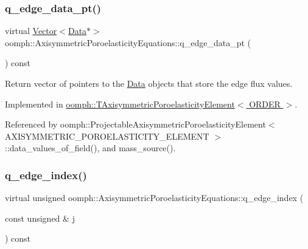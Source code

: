 \subsubsection{\texorpdfstring{q\+\_\+edge\+\_\+data\+\_\+pt()}{q\_edge\_data\_pt()}}
{\footnotesize\ttfamily virtual \hyperlink{classoomph_1_1Vector}{Vector}$<$\hyperlink{classoomph_1_1Data}{Data}$\ast$$>$ oomph\+::\+Axisymmetric\+Poroelasticity\+Equations\+::q\+\_\+edge\+\_\+data\+\_\+pt (\begin{DoxyParamCaption}{ }\end{DoxyParamCaption}) const\hspace{0.3cm}{\ttfamily [pure virtual]}}



Return vector of pointers to the \hyperlink{classoomph_1_1Data}{Data} objects that store the edge flux values. 



Implemented in \hyperlink{classoomph_1_1TAxisymmetricPoroelasticityElement_af13ce25c9c2d1a907690319576631b87}{oomph\+::\+T\+Axisymmetric\+Poroelasticity\+Element$<$ O\+R\+D\+E\+R $>$}.



Referenced by oomph\+::\+Projectable\+Axisymmetric\+Poroelasticity\+Element$<$ A\+X\+I\+S\+Y\+M\+M\+E\+T\+R\+I\+C\+\_\+\+P\+O\+R\+O\+E\+L\+A\+S\+T\+I\+C\+I\+T\+Y\+\_\+\+E\+L\+E\+M\+E\+N\+T $>$\+::data\+\_\+values\+\_\+of\+\_\+field(), and mass\+\_\+source().

\mbox{\label{classoomph_1_1AxisymmetricPoroelasticityEquations_a5dc540a1c4f63f5023d2688aa15c2614}} 
\subsubsection{\texorpdfstring{q\+\_\+edge\+\_\+index()}{q\_edge\_index()}}
{\footnotesize\ttfamily virtual unsigned oomph\+::\+Axisymmetric\+Poroelasticity\+Equations\+::q\+\_\+edge\+\_\+index (\begin{DoxyParamCaption}\item[{const unsigned \&}]{j }\end{DoxyParamCaption}) const\hspace{0.3cm}{\ttfamily [pure virtual]}}



